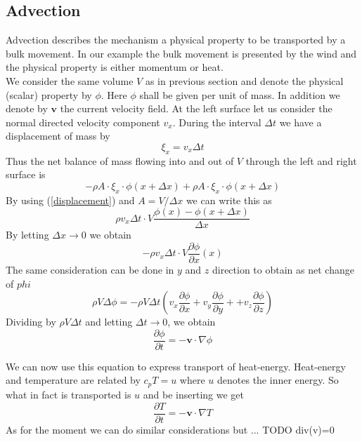 \documentclass[]{article}
\begin{document}
\subsection{Advection}
Advection describes the mechanism a physical property to be transported by a bulk movement. In our example the bulk movement is presented by the wind and the physical property is either momentum or heat.\\
We consider the same volume $V$ as in previous section and denote the physical (scalar) property by $\phi$. Here $\phi$ shall be given per unit of mass. In addition we denote by $\textbf{v}$ the current velocity field. At the left surface let us consider the normal directed velocity component $v_x$. During the interval $\Delta t$ we have a displacement of mass by
\begin{equation} \label{displacement}
\xi_{x}=v_x\Delta t
\end{equation}
Thus the net balance of mass flowing into and out of $V$ through the left and right surface is
\begin{equation*}
-\rho A\cdot\xi_{x} \cdot \phi(x+\Delta x)+\rho A\cdot\xi_{x} \cdot \phi(x+\Delta x)
\end{equation*}
By using (\ref{displacement}) and $A=V/\Delta x$ we can write this as
\begin{equation*}
\rho v_x\Delta t\cdot V \frac{\phi (x)-\phi(x+\Delta x)}{\Delta x}
\end{equation*}
By letting $\Delta x\rightarrow 0$ we obtain
\begin{equation*}
-\rho v_x\Delta t\cdot V \frac{\partial \phi}{\partial x}(x)
\end{equation*}
The same consideration can be done in $y$ and $z$ direction to obtain as net change of $phi$
\begin{equation*}
\rho V \Delta \phi = -\rho V \Delta t \left(v_x \frac{\partial \phi}{\partial x}+
 v_y \frac{\partial \phi}{\partial y}+
 +v_z \frac{\partial \phi}{\partial z}\right)
\end{equation*}
Dividing by $\rho V \Delta t$ and letting $\Delta t\rightarrow 0$, we obtain
\begin{equation} \label{transp_equation}
\frac{\partial\phi}{\partial t}=-\textbf{v}\cdot\nabla\phi
\end{equation}

We can now use this equation to express transport of heat-energy. Heat-energy and temperature are 
related by $c_p T=u$ where $u$ denotes the inner energy. So what in fact is transported is $u$ and be inserting we get
\begin{equation} \label{transp_heat}
\frac{\partial T}{\partial t}=-\textbf{v}\cdot\nabla T
\end{equation}
As for the moment we can do similar considerations but  ... TODO  div(v)=0
\end{document}
